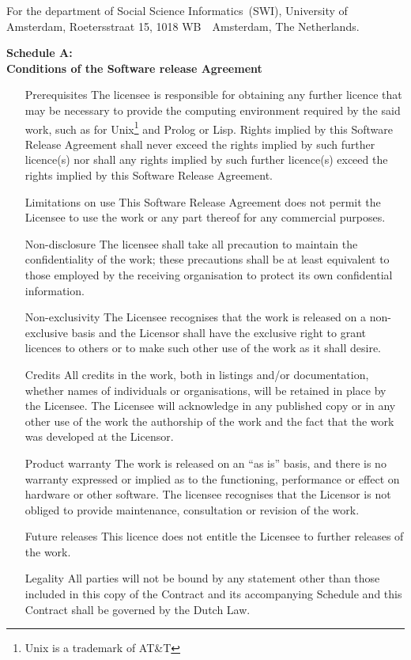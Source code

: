 For the department of Social Science Informatics~(SWI), University of
Amsterdam, Roetersstraat 15, 1018 WB~~Amsterdam, The Netherlands. 
\vspace{1cm}

\fillin \next
{}\fillin
\vspace{1cm}

\begin{center}
    \Large \bf Schedule A: \\
    Conditions of the Software release Agreement
\end{center}
\begin{enumerate}
    \item[Prerequisites]
The licensee is responsible for obtaining any further licence that may
be necessary to provide the computing environment required by the said
work, such as for Unix\footnote{Unix is a trademark of AT\&T} and Prolog
or Lisp.
Rights implied by this Software Release Agreement shall never exceed the
rights implied by such further licence(s) nor shall any rights implied
by such further licence(s) exceed the rights implied by this Software
Release Agreement.
    \item[Limitations on use]
This Software Release Agreement does not permit the Licensee to use the
work or any part thereof for any commercial purposes.
    \item[Non-disclosure]
The licensee shall take all precaution to maintain the confidentiality
of the work; these precautions shall be at least equivalent to those
employed by the receiving organisation to protect its own confidential
information. 
    \item[Non-exclusivity]
The Licensee recognises that the work is released on a non-exclusive
basis and the Licensor shall have the exclusive right to grant licences
to others or to make such other use of the work as it shall desire.
    \item[Credits]
All credits in the work, both in listings and/or documentation, whether
names of individuals or organisations, will be retained in place by the
Licensee. The Licensee will acknowledge in any published copy or in any
other use of the work the authorship of the work and the fact that the
work was developed at the Licensor.
    \item[Product warranty]
The work is released on an ``as is'' basis, and there is no warranty
expressed or  implied as to the functioning, performance or effect on
hardware or other software. The licensee recognises that the Licensor
is not obliged to provide maintenance, consultation or revision of the
work.
    \item[Future releases]
This licence does not entitle the Licensee to further releases of the
work.
    \item[Legality]
All parties will not be bound by any statement other than those included
in this copy of the Contract and its accompanying Schedule and this
Contract shall be governed by the Dutch Law.
\end{enumerate}


